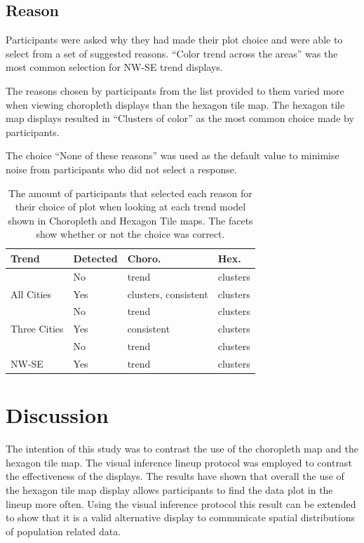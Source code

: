\documentclass[
]{article}
\begin{document}
\subsection{Reason}\label{reason}

Participants were asked why they had made their plot choice and were
able to select from a set of suggested reasons. ``Color trend across the
areas'' was the most common selection for NW-SE trend displays.

The reasons chosen by participants from the list provided to them varied
more when viewing choropleth displays than the hexagon tile map. The
hexagon tile map displays resulted in ``Clusters of color'' as the most
common choice made by participants.

The choice ``None of these reasons'' was used as the default value to
minimise noise from participants who did not select a response.

\begin{table}

\caption{\label{tab:reason}The amount of participants that selected each reason for their choice of plot when looking at each trend model shown in Choropleth and Hexagon Tile maps. The facets show whether or not the choice was correct.}
\centering
\begin{tabular}[t]{llll}
\toprule
Trend & Detected & Choro. & Hex.\\
\midrule
 & No & trend & clusters\\
\cmidrule{2-4}
\multirow{-2}{*}{\raggedright\arraybackslash All Cities} & Yes & clusters, consistent & clusters\\
\cmidrule{1-4}
 & No & trend & clusters\\
\cmidrule{2-4}
\multirow{-2}{*}{\raggedright\arraybackslash Three Cities} & Yes & consistent & clusters\\
\cmidrule{1-4}
 & No & trend & clusters\\
\cmidrule{2-4}
\multirow{-2}{*}{\raggedright\arraybackslash NW-SE} & Yes & trend & clusters\\
\bottomrule
\end{tabular}
\end{table}

\section{Discussion}\label{discussion}

The intention of this study was to contrast the use of the choropleth
map and the hexagon tile map. The visual inference lineup protocol was
employed to contrast the effectiveness of the displays. The results have
shown that overall the use of the hexagon tile map display allows
participants to find the data plot in the lineup more often. Using the
visual inference protocol this result can be extended to show that it is
a valid alternative display to communicate spatial distributions of
population related data.
\end{document}

